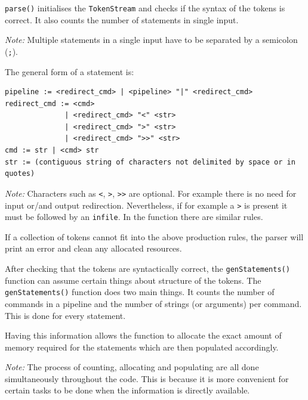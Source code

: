 \documentclass[12pt]{article}
\begin{document}
\newpage



\texttt{parse()} initialises the \texttt{TokenStream} and checks
if the syntax of the tokens is correct. It also counts the
number of statements in single input.

\textit{Note:} Multiple statements in a single input have to
be separated by a semicolon (\texttt{;}).

The general form of a statement is:

\begin{verbatim}
pipeline := <redirect_cmd> | <pipeline> "|" <redirect_cmd>
redirect_cmd := <cmd>
              | <redirect_cmd> "<" <str>
              | <redirect_cmd> ">" <str>
              | <redirect_cmd> ">>" <str> 
cmd := str | <cmd> str
str := (contiguous string of characters not delimited by space or in quotes)
\end{verbatim}

\textit{Note:} Characters such as \texttt{\textless},
\texttt{\textgreater}, \texttt{{\textgreater}{\textgreater}} are
optional. For example there is no need for input or/and output
redirection. Nevertheless, if for example a
\texttt{\textgreater} is present it must be followed by an
\texttt{infile}. In the function there are similar rules.

If a collection of tokens cannot fit into the above production
rules, the parser will print an error and clean any allocated
resources.

After checking that the tokens are syntactically correct, the
\texttt{genStatements()} function can assume certain things
about structure of the tokens. The \texttt{genStatements()}
function does two main things. It counts the number of commands
in a pipeline and the number of strings (or arguments) per
command. This is done for every statement.

Having this information allows the function to allocate the
exact amount of memory required for the statements which are
then populated accordingly.

\textit{Note:} The process of counting, allocating and
populating are all done simultaneously throughout the code. This
is because it is more convenient for certain tasks to be done
when the information is directly available.


\end{document}
